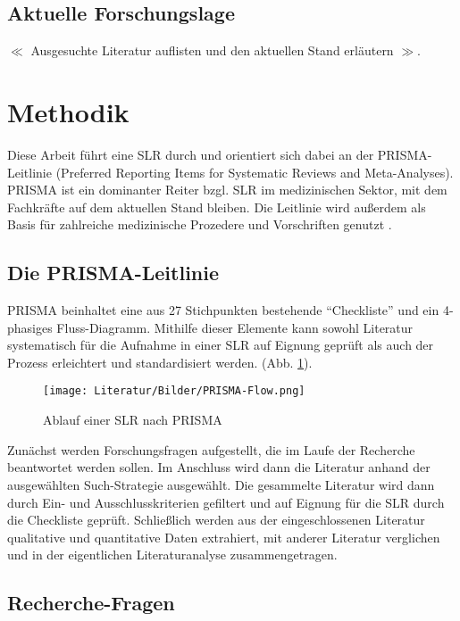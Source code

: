 \documentclass{scrartcl}
\begin{document}
\subsection{Aktuelle Forschungslage}
$\ll$ Ausgesuchte Literatur auflisten und den aktuellen Stand erläutern $\gg$.

\section{Methodik}

Diese Arbeit führt eine SLR durch und orientiert sich
dabei an der PRISMA-Leitlinie (Preferred Reporting Items for Systematic Reviews and
Meta-Analyses).  PRISMA ist ein dominanter Reiter bzgl. SLR im medizinischen Sektor,
mit dem Fachkräfte auf dem aktuellen Stand bleiben.  Die Leitlinie wird außerdem als
Basis für zahlreiche medizinische Prozedere und Vorschriften genutzt \cite{prisma}.

\subsection{Die PRISMA-Leitlinie}
PRISMA beinhaltet eine aus 27 Stichpunkten bestehende \enquote{Checkliste} und
ein 4-phasiges Fluss-Diagramm. Mithilfe dieser Elemente kann sowohl Literatur 
systematisch für die Aufnahme in einer SLR auf Eignung geprüft als auch der 
Prozess erleichtert und standardisiert werden.
(Abb. \ref{fig:prisma1}).

\begin{figure}[h]
   \begin{center}
      \texttt{[image: Literatur/Bilder/PRISMA-Flow.png]}
   \end{center}
   \caption{Ablauf einer SLR nach PRISMA \cite{ex1}}
   \label{fig:prisma1}
\end{figure}

Zunächst werden Forschungsfragen aufgestellt, die im Laufe der Recherche beantwortet
werden sollen. Im Anschluss wird dann die Literatur anhand der ausgewählten 
Such-Strategie ausgewählt. Die gesammelte Literatur wird dann durch Ein- und
Ausschlusskriterien gefiltert und auf Eignung für die SLR durch die Checkliste geprüft.
Schließlich werden aus der eingeschlossenen Literatur qualitative und quantitative
Daten extrahiert, mit anderer Literatur verglichen und in der eigentlichen
Literaturanalyse zusammengetragen.


\subsection{Recherche-Fragen}
\end{document}
